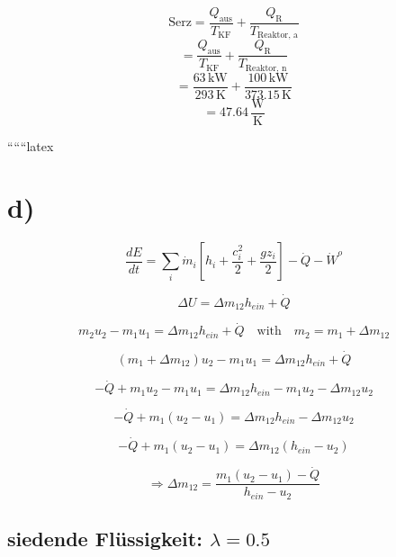 \[
\text{Serz} = \frac{Q_{\text{aus}}}{T_{\text{KF}}} + \frac{Q_{\text{R}}}{T_{\text{Reaktor, a}}}
\]
\[
= \frac{Q_{\text{aus}}}{T_{\text{KF}}} + \frac{Q_{\text{R}}}{T_{\text{Reaktor, n}}}
\]
\[
= \frac{63 \, \text{kW}}{293 \, \text{K}} + \frac{100 \, \text{kW}}{373.15 \, \text{K}}
\]
\[
= 47.64 \, \frac{\text{W}}{\text{K}}
\]

``````latex


\section*{d)}

\begin{equation*}
\frac{dE}{dt} = \sum_i \dot{m}_i \left[ h_i + \frac{c_i^2}{2} + \frac{g z_i}{2} \right] - \dot{Q} - \dot{W}^o
\end{equation*}

\begin{equation*}
\Delta U = \Delta m_{12} h_{ein} + \dot{Q}
\end{equation*}

\begin{equation*}
m_2 u_2 - m_1 u_1 = \Delta m_{12} h_{ein} + \dot{Q} \quad \text{with} \quad m_2 = m_1 + \Delta m_{12}
\end{equation*}

\begin{equation*}
(m_1 + \Delta m_{12}) u_2 - m_1 u_1 = \Delta m_{12} h_{ein} + \dot{Q}
\end{equation*}

\begin{equation*}
- \dot{Q} + m_1 u_2 - m_1 u_1 = \Delta m_{12} h_{ein} - m_1 u_2 - \Delta m_{12} u_2
\end{equation*}

\begin{equation*}
- \dot{Q} + m_1 (u_2 - u_1) = \Delta m_{12} h_{ein} - \Delta m_{12} u_2
\end{equation*}

\begin{equation*}
- \dot{Q} + m_1 (u_2 - u_1) = \Delta m_{12} (h_{ein} - u_2)
\end{equation*}

\begin{equation*}
\Rightarrow \Delta m_{12} = \frac{m_1 (u_2 - u_1) - \dot{Q}}{h_{ein} - u_2}
\end{equation*}

\subsection*{siedende Flüssigkeit: $\lambda = 0.5$}

